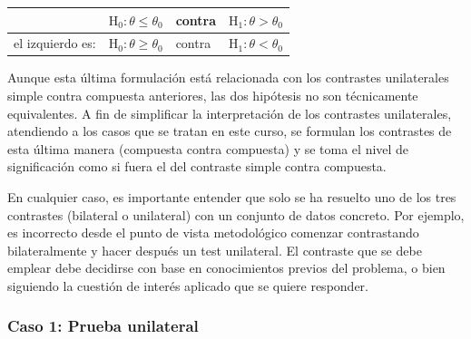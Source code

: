 \documentclass[
]{article}
\begin{document}
\begin{longtable}[]{@{}
  >{\raggedright\arraybackslash}p{}
  >{\raggedright\arraybackslash}p{}
  >{\raggedright\arraybackslash}p{}
  >{\raggedright\arraybackslash}p{}@{}}
\toprule\noalign{}
\begin{minipage}[b]{\linewidth}\raggedright
\end{minipage} & \begin{minipage}[b]{\linewidth}\raggedright
\(\mathrm{H}_{0}: \theta \leq \theta_{0}\)
\end{minipage} & \begin{minipage}[b]{\linewidth}\raggedright
contra
\end{minipage} & \begin{minipage}[b]{\linewidth}\raggedright
\(\mathrm{H}_{1}: \theta>\theta_{0}\)
\end{minipage} \\
\midrule\noalign{}
\endhead
\bottomrule\noalign{}
\endlastfoot
el izquierdo es: & \(\mathrm{H}_{0}: \theta \geq \theta_{0}\) & contra & \(\mathrm{H}_{1}: \theta<\theta_{0}\) \\
\end{longtable}

Aunque esta última formulación está relacionada con los contrastes unilaterales simple contra compuesta anteriores, las dos hipótesis no son técnicamente equivalentes. A fin de simplificar la interpretación de los contrastes unilaterales, atendiendo a los casos que se tratan en este curso, se formulan los contrastes de esta última manera (compuesta contra compuesta) y se toma el nivel de significación como si fuera el del contraste simple contra compuesta.

En cualquier caso, es importante entender que solo se ha resuelto uno de los tres contrastes (bilateral o unilateral) con un conjunto de datos concreto. Por ejemplo, es incorrecto desde el punto de vista metodológico comenzar contrastando bilateralmente y hacer después un test unilateral. El contraste que se debe emplear debe decidirse con base en conocimientos previos del problema, o bien siguiendo la cuestión de interés aplicado que se quiere responder.

\subsubsection{Caso 1: Prueba unilateral}\label{caso-1-prueba-unilateral}
\end{document}
